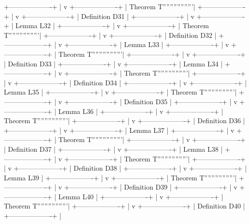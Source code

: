 +-------------------+
        |
        v
+-------------------+
| Theorem T'''''''''''''''''|
+-------------------+
        |
        v
+-------------------+
| Definition D31    |
+-------------------+
        |
        v
+-------------------+
| Lemma L32         |
+-------------------+
        |
        v
+-------------------+
| Theorem T'''''''''''''''''|
+-------------------+
        |
        v
+-------------------+
| Definition D32    |
+-------------------+
        |
        v
+-------------------+
| Lemma L33         |
+-------------------+
        |
        v
+-------------------+
| Theorem T'''''''''''''''''|
+-------------------+
        |
        v
+-------------------+
| Definition D33    |
+-------------------+
        |
        v
+-------------------+
| Lemma L34         |
+-------------------+
        |
        v
+-------------------+
| Theorem T'''''''''''''''''|
+-------------------+
        |
        v
+-------------------+
| Definition D34    |
+-------------------+
        |
        v
+-------------------+
| Lemma L35         |
+-------------------+
        |
        v
+-------------------+
| Theorem T'''''''''''''''''|
+-------------------+
        |
        v
+-------------------+
| Definition D35    |
+-------------------+
        |
        v
+-------------------+
| Lemma L36         |
+-------------------+
        |
        v
+-------------------+
| Theorem T'''''''''''''''''|
+-------------------+
        |
        v
+-------------------+
| Definition D36    |
+-------------------+
        |
        v
+-------------------+
| Lemma L37         |
+-------------------+
        |
        v
+-------------------+
| Theorem T'''''''''''''''''|
+-------------------+
        |
        v
+-------------------+
| Definition D37    |
+-------------------+
        |
        v
+-------------------+
| Lemma L38         |
+-------------------+
        |
        v
+-------------------+
| Theorem T'''''''''''''''''|
+-------------------+
        |
        v
+-------------------+
| Definition D38    |
+-------------------+
        |
        v
+-------------------+
| Lemma L39         |
+-------------------+
        |
        v
+-------------------+
| Theorem T'''''''''''''''''|
+-------------------+
        |
        v
+-------------------+
| Definition D39    |
+-------------------+
        |
        v
+-------------------+
| Lemma L40         |
+-------------------+
        |
        v
+-------------------+
| Theorem T'''''''''''''''''|
+-------------------+
        |
        v
+-------------------+
| Definition D40    |
+-------------------+
        |
